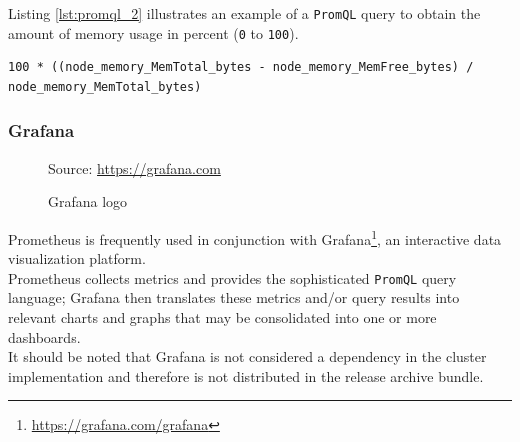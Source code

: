 Listing \ref{lst:promql_2} illustrates an example of a \texttt{PromQL} query to
obtain the amount of memory usage in percent (\texttt{0} to \texttt{100}).

\begin{lstlisting}[language=promql, numbers=none, alsoletter={_, 0, 1}, morekeywords={[2]{node_memory_MemTotal_bytes, node_memory_MemFree_bytes}}, morekeywords={[4]{100}}, xleftmargin=\parindent, label={lst:promql_2}, caption=\texttt{PromQL} query to obtain the amount of memory usage in percent]
  100 * ((node_memory_MemTotal_bytes - node_memory_MemFree_bytes) / node_memory_MemTotal_bytes)
\end{lstlisting}

\subsubsection{Grafana}
\label{subsubsec:implementation_dependencies_prometheus_grafana}

\begin{figure} %
  \centering
  \def\stackalignment{l} %
  {\scriptsize \parbox[t]{\linewidth}{ Source: \url{https://grafana.com}} }
  \caption{Grafana logo}
\end{figure}

Prometheus is frequently used in conjunction with Grafana\footnote{\url{https://grafana.com/grafana}},
an interactive data visualization platform\cite{grafana}. \\ %
Prometheus collects metrics and provides the sophisticated \texttt{PromQL} query
language; Grafana then translates these metrics and/or query results into relevant
charts and graphs that may be consolidated into one or more dashboards. \\ %
It should be noted that Grafana is not considered a dependency in the cluster implementation
and therefore is not distributed in the release archive bundle.

